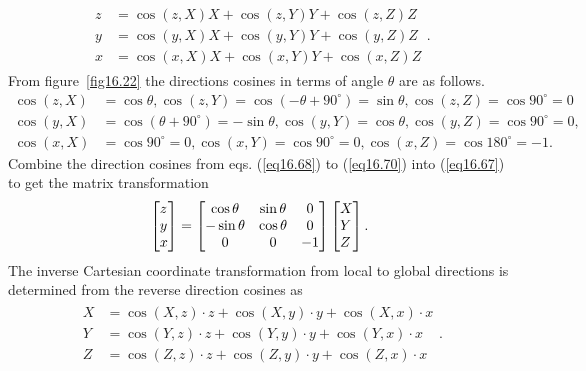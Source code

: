 \documentclass{AeroStructure-ERJohnson}
\begin{document}
\vspace*{-1.25pc}

\begin{align}\label{eq16.67}
\begin{split}
z&=\cos (z, X) X+\cos (z, Y) Y+\cos (z, Z) Z \\
y&=\cos (y, X) X+\cos (y, Y) Y+\cos (y, Z) Z \\
x&=\cos (x, X) X+\cos (x, Y) Y+\cos (x, Z) Z
\end{split}.
\end{align}
From figure~\ref{fig16.22} the directions cosines in terms of angle $\theta$ are as follows.
\begin{align}
\cos (z, X)&=\cos \theta, \cos (z, Y)=\cos \left(-\theta+90^{\circ}\right)=\sin \theta, \cos (z, Z)=\cos 90^{\circ}=0\label{eq16.68}\\
\cos (y, X)&=\cos \left(\theta+90^{\circ}\right)=-\sin \theta, \cos (y, Y)=\cos \theta, \cos (y, Z)=\cos 90^{\circ}=0,\label{eq16.69}\\
\cos (x, X)&=\cos 90^{\circ}=0, \cos (x, Y)=\cos 90^{\circ}=0, \cos (x, Z)=\cos 180^{\circ}=-1.\label{eq16.70}
\end{align}
Combine the direction cosines from eqs. (\ref{eq16.68}) to (\ref{eq16.70})  into (\ref{eq16.67}) to get the matrix transformation
\begin{align}\label{eq16.71}
\left[\begin{array}{@{}l@{}}z \\y \\x\end{array}\right]=\left[\begin{array}{@{}ccc@{}}\cos \theta & \sin \theta & 0 \\-\sin \theta & \cos \theta & 0 \\0 & 0 & -1\end{array}\right]\left[\begin{array}{@{}l@{}}X \\Y \\Z\end{array}\right].
\end{align}
The inverse Cartesian coordinate transformation from local to global directions is determined from the reverse direction cosines as
\begin{align}\label{eq16.72}
\begin{split}
X&=\cos (X, z) \cdot z+\cos (X, y) \cdot y+\cos (X, x) \cdot x \\
Y&=\cos (Y, z) \cdot z+\cos (Y, y) \cdot y+\cos (Y, x) \cdot x \\
Z&=\cos (Z, z) \cdot z+\cos (Z, y) \cdot y+\cos (Z, x) \cdot x
\end{split}.
\end{align}
\end{document}
